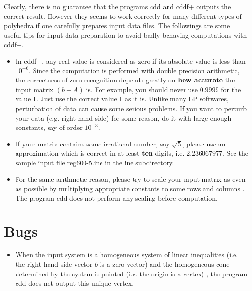 \documentclass[11pt]{article}
\begin{document}
Clearly, there is no guarantee 
that the programs cdd and cddf+ outputs the correct result.  
However they seems to work correctly 
for many different types of polyhedra if one
carefully prepares input data files.   The followings
are some useful tips  for  input data preparation to 
avoid badly behaving computations with cddf+.

\begin{itemize}

\item  In cddf+, any real value is considered as zero if its absolute value is
less than $10^{-6}$.  Since the computation is performed with double precision
arithmetic, the correctness of zero recognition depends greatly on {\bf how
accurate\/} the input matrix $(b- A)$ is.  For example, you should never use
$0.9999$ for the value $1$.  Just use the correct value $1$ as it is.
Unlike many LP softwares, perturbation of data
can cause some serious problems.  If you want to perturb your data (e.g. right
hand side) for some reason, do it with large enough constants, say of order
$10^{-3}$.


\item If your matrix contains some irrational number, say
$\sqrt{5}$, please use an approximation which is correct in at least {\bf ten\/} digits,
i.e.  $2.236067977$.   See the sample input file  reg600-5.ine in the ine subdirectory.
 
\item  For the same arithmetic reason, please try to scale your input matrix
as even as possible by multiplying appropriate constants to some rows and
columns .   The program cdd does not perform any scaling before
computation.

\end{itemize}

\section{Bugs}  \label{BUGS}
\begin{itemize}

\item When the input system is a homogeneous system of linear inequalities
(i.e. the right hand side vector $b$ is a zero vector) and the homogeneous
cone determined by the system is pointed (i.e. the origin is a vertex) , 
the program cdd does not output this unique vertex.

\end{itemize}
\end{document}
